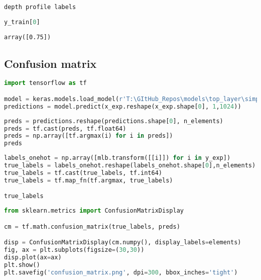 \begin{lstlisting}
depth profile labels
\end{lstlisting}

\begin{lstlisting}[language=Python]
y_train[0]
\end{lstlisting}

\begin{lstlisting}
array([0.75])
\end{lstlisting}

\hypertarget{confusion-matrix}{%
\subsection{Confusion matrix}\label{confusion-matrix}}

\begin{lstlisting}[language=Python]
import tensorflow as tf

model = keras.models.load_model(r'T:\GItHub_Repos\models\top_layer\simple_cnn_dct_top_layer.h5')
predictions = model.predict(x_exp.reshape(x_exp.shape[0], 1,1024))
\end{lstlisting}

\begin{lstlisting}[language=Python]
preds = predictions.reshape(predictions.shape[0], n_elements)
preds = tf.cast(preds, tf.float64)
preds = np.array([tf.argmax(i) for i in preds])
preds
\end{lstlisting}

\begin{lstlisting}[language=Python]
labels_onehot = np.array([mlb.transform([[i]]) for i in y_exp])
true_labels = labels_onehot.reshape(labels_onehot.shape[0],n_elements)
true_labels = tf.cast(true_labels, tf.int64)
true_labels = tf.map_fn(tf.argmax, true_labels)

true_labels
\end{lstlisting}

\begin{lstlisting}[language=Python]
from sklearn.metrics import ConfusionMatrixDisplay

cm = tf.math.confusion_matrix(true_labels, preds)

disp = ConfusionMatrixDisplay(cm.numpy(), display_labels=elements)
fig, ax = plt.subplots(figsize=(30,30))
disp.plot(ax=ax)
plt.show()
plt.savefig('confusion_matrix.png', dpi=300, bbox_inches='tight')
\end{lstlisting}
